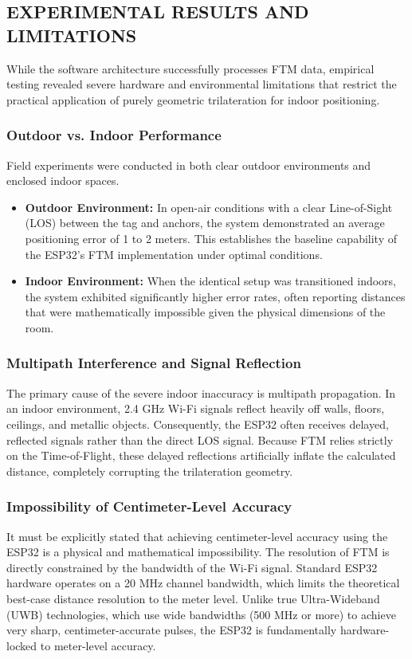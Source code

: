 \documentclass[conference]{IEEEtran}
\begin{document}
\subsection{EXPERIMENTAL RESULTS AND LIMITATIONS}
While the software architecture successfully processes FTM data, empirical testing revealed severe hardware and environmental limitations that restrict the practical application of purely geometric trilateration for indoor positioning.

\subsubsection{Outdoor vs. Indoor Performance}
Field experiments were conducted in both clear outdoor environments and enclosed indoor spaces. 
\begin{itemize}
    \item \textbf{Outdoor Environment:} In open-air conditions with a clear Line-of-Sight (LOS) between the tag and anchors, the system demonstrated an average positioning error of 1 to 2 meters. This establishes the baseline capability of the ESP32's FTM implementation under optimal conditions.
    \item \textbf{Indoor Environment:} When the identical setup was transitioned indoors, the system exhibited significantly higher error rates, often reporting distances that were mathematically impossible given the physical dimensions of the room.
\end{itemize}

\subsubsection{Multipath Interference and Signal Reflection}

The primary cause of the severe indoor inaccuracy is multipath propagation. In an indoor environment, 2.4 GHz Wi-Fi signals reflect heavily off walls, floors, ceilings, and metallic objects. Consequently, the ESP32 often receives delayed, reflected signals rather than the direct LOS signal. Because FTM relies strictly on the Time-of-Flight, these delayed reflections artificially inflate the calculated distance, completely corrupting the trilateration geometry. 

\subsubsection{Impossibility of Centimeter-Level Accuracy}
It must be explicitly stated that achieving centimeter-level accuracy using the ESP32 is a physical and mathematical impossibility. The resolution of FTM is directly constrained by the bandwidth of the Wi-Fi signal. Standard ESP32 hardware operates on a 20 MHz channel bandwidth, which limits the theoretical best-case distance resolution to the meter level. Unlike true Ultra-Wideband (UWB) technologies, which use wide bandwidths (500 MHz or more) to achieve very sharp, centimeter-accurate pulses, the ESP32 is fundamentally hardware-locked to meter-level accuracy.
\newpage
\end{document}
